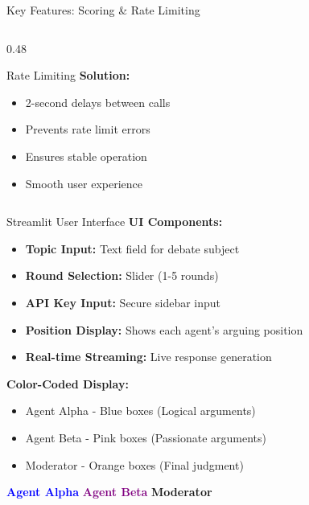 \documentclass[aspectratio=169]{beamer}
\begin{document}
\begin{frame}{Key Features: Scoring \& Rate Limiting}
\begin{columns}
\begin{column}{0.48\textwidth}
\begin{block}{Rate Limiting}
                \textbf{Solution:}
                \begin{itemize}
                    \footnotesize
                    \item 2-second delays between calls
                    \item Prevents rate limit errors
                    \item Ensures stable operation
                    \item Smooth user experience
                \end{itemize}
            \end{block}
        \end{column}
    \end{columns}
\end{frame}

\begin{frame}{Streamlit User Interface}
    \textbf{UI Components:}
    \begin{itemize}
        \item \textbf{Topic Input:} Text field for debate subject
        \item \textbf{Round Selection:} Slider (1-5 rounds)
        \item \textbf{API Key Input:} Secure sidebar input
        \item \textbf{Position Display:} Shows each agent's arguing position
        \item \textbf{Real-time Streaming:} Live response generation
    \end{itemize}
    
    \vspace{0.5cm}
    
    \textbf{Color-Coded Display:}
    \begin{itemize}
        \item Agent Alpha - Blue boxes (Logical arguments)
        \item Agent Beta - Pink boxes (Passionate arguments)
        \item Moderator - Orange boxes (Final judgment)
    \end{itemize}
    
    \vspace{0.3cm}
    
    \begin{center}
        \colorbox{blue!10}{\textcolor{blue}{\textbf{Agent Alpha}}} \quad
        \colorbox{pink!30}{\textcolor{purple}{\textbf{Agent Beta}}} \quad
        \colorbox{orange!20}{\textcolor{orange!80!black}{\textbf{Moderator}}}
    \end{center}
\end{frame}
\end{document}
